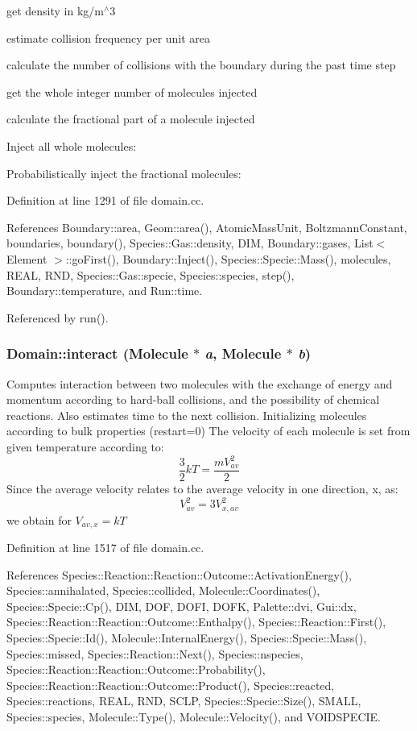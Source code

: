 get density in kg/m$^\wedge$3

estimate collision frequency per unit area

calculate the number of collisions with the boundary during the past time step

get the whole integer number of molecules injected

calculate the fractional part of a molecule injected

Inject all whole molecules:

Probabilistically inject the fractional molecules: 

Definition at line 1291 of file domain.cc.

References Boundary::area, Geom::area(), AtomicMassUnit, BoltzmannConstant, boundaries, boundary(), Species::Gas::density, DIM, Boundary::gases, List$<$ Element $>$::goFirst(), Boundary::Inject(), Species::Specie::Mass(), molecules, REAL, RND, Species::Gas::specie, Species::species, step(), Boundary::temperature, and Run::time.

Referenced by run().\hypertarget{classDomain_08b06bbed0954459ae2bb38c20c6a7a8}{
\subsubsection[{interact}]{ Domain::interact ({\bf Molecule} $\ast$ {\em a}, \/  {\bf Molecule} $\ast$ {\em b})}}
\label{classDomain_08b06bbed0954459ae2bb38c20c6a7a8}


Computes interaction between two molecules with the exchange of energy and momentum according to hard-ball collisions, and the possibility of chemical reactions. Also estimates time to the next collision. Initializing molecules according to bulk properties (restart=0) The velocity of each molecule is set from given temperature according to: \[ \frac{3}{2}kT = \frac{mV_{av}^2}{2} \] Since the average velocity relates to the average velocity in one direction, x, as: \[ V_{av}^2 = 3V_{x,av}^2 \] we obtain for $V_{av,x} = kT$ 

Definition at line 1517 of file domain.cc.

References Species::Reaction::Reaction::Outcome::ActivationEnergy(), Species::annihalated, Species::collided, Molecule::Coordinates(), Species::Specie::Cp(), DIM, DOF, DOFI, DOFK, Palette::dvi, Gui::dx, Species::Reaction::Reaction::Outcome::Enthalpy(), Species::Reaction::First(), Species::Specie::Id(), Molecule::InternalEnergy(), Species::Specie::Mass(), Species::missed, Species::Reaction::Next(), Species::nspecies, Species::Reaction::Reaction::Outcome::Probability(), Species::Reaction::Reaction::Outcome::Product(), Species::reacted, Species::reactions, REAL, RND, SCLP, Species::Specie::Size(), SMALL, Species::species, Molecule::Type(), Molecule::Velocity(), and VOIDSPECIE.

